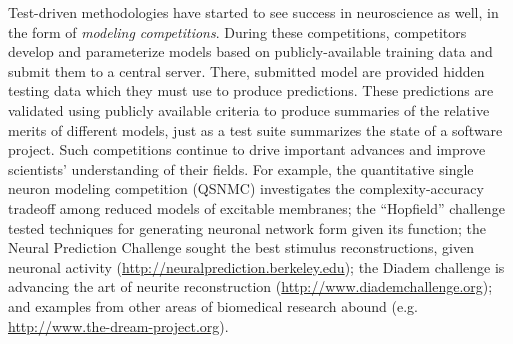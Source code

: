 \documentclass{frontiersSCNS}
\begin{document}
Test-driven methodologies have started to see success in neuroscience as well, in the form of \emph{modeling competitions}. 
During these competitions, competitors develop and parameterize models based on publicly-available training data and submit them to a central server. There, submitted model are provided hidden testing data which they must use to produce predictions. These predictions are validated using publicly available criteria to produce summaries of the relative merits of different models, just as a test suite summarizes the state of a software project. 
Such competitions continue to drive important advances and improve scientists' understanding of their fields. 
For example, the quantitative single neuron modeling competition (QSNMC) \citep{jolivet_quantitative_2008} investigates the complexity-accuracy tradeoff among reduced models of excitable membranes; 
the ``Hopfield'' challenge \citep{hopfield_what_2000} tested techniques for generating neuronal network form given its function; 
the Neural Prediction Challenge sought the best stimulus reconstructions, given neuronal activity (\url{http://neuralprediction.berkeley.edu}); the Diadem challenge is advancing the art of neurite reconstruction (\url{http://www.diademchallenge.org}); and 
examples from other areas of biomedical research abound (e.g. \url{http://www.the-dream-project.org}).
\end{document}
